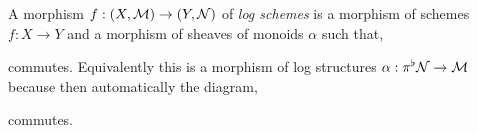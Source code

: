 \documentclass[12pt]{article}
\begin{document}
\begin{defn}
A morphism $f : (X, \mathcal{M}) \to (Y, \mathcal{N})$ of \textit{log schemes} is a morphism of schemes $f : X \to Y$ and a morphism of sheaves of monoids $\alpha$ such that,
\begin{center}
\end{center}
commutes. Equivalently this is a morphism of log structures $\alpha : \pi^\flat \mathcal{N} \to \mathcal{M}$ because then automatically the diagram,
\begin{center}
\end{center}
commutes.
\end{defn}
\end{document}

